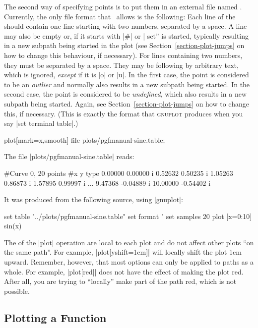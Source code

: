 The second way of specifying points is to put them in an external file named
. Currently, the only file format that \tikzname\ allows is the
following: Each line of the  should contain one line starting
with two numbers, separated by a space. A line may also be empty or, if it
starts with |#| or |%
set'' is started, typically resulting in a new subpath being started in the
plot (see Section~\ref{section-plot-jumps} on how to change this behaviour, if
necessary). For lines containing two numbers, they must be separated by a
space. They may be following by arbitrary text, which is ignored, \emph{except}
if it is |o| or |u|. In the first case, the point is considered to be an
\emph{outlier} and normally also results in a new subpath being started. In the
second case, the point is considered to be \emph{undefined}, which also results
in a new subpath being started. Again, see Section~\ref{section-plot-jumps} on
how to change this, if necessary. (This is exactly the format that
\textsc{gnuplot} produces when you say |set terminal table|.)
%
\begin{codeexample}[]
\tikz \draw plot[mark=x,smooth] file {plots/pgfmanual-sine.table};
\end{codeexample}

The file |plots/pgfmanual-sine.table| reads:
%
\begin{codeexample}
#Curve 0, 20 points
#x y type
0.00000 0.00000  i
0.52632 0.50235  i
1.05263 0.86873  i
1.57895 0.99997  i
...
9.47368 -0.04889  i
10.00000 -0.54402  i
\end{codeexample}
%
It was produced from the following source, using |gnuplot|:
%
\begin{codeexample}
set table  "../plots/pgfmanual-sine.table"
set format "%
set samples 20
plot [x=0:10] sin(x)
\end{codeexample}

The  of the |plot| operation are local to each plot and do
not affect other plots ``on the same path''. For example, |plot[yshift=1cm]|
will locally shift the plot 1cm upward. Remember, however, that most options
can only be applied to paths as a whole. For example, |plot[red]| does not have
the effect of making the plot red. After all, you are trying to ``locally''
make part of the path red, which is not possible.


\subsection{Plotting a Function}
\label{section-tikz-plot}

